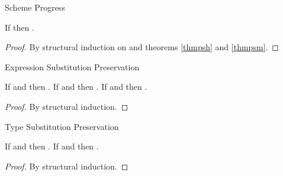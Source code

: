 \begin{theorem}{Scheme Progress}

\label{thmpss}
If \judes{}{\first{\varexps}}{\tytst} then \pshyp{\first{\varexps}}{\second{\varexps}}.
\begin{proof}
By structural induction on \first{\varexps} and theorems \ref{thmpsh} and \ref{thmpsm}.
\end{proof}
\end{theorem}

\begin{lemma}{Expression Substitution Preservation}

\label{lemexp}
If \judeh{\envexte{\env}{\first{\varvarh}}{\first{\vartyh}}}{\first{\varexph}}{\second{\vartyh}} and \judeh{\env}{\second{\varexph}}{\first{\vartyh}} then \judeh{\env}{\expsubst{\first{\varexph}}{\second{\varexph}}{\first{\varvarh}}}{\second{\vartyh}}.  If \judem{\envexte{\env}{\first{\varvarm}}{\first{\vartym}}}{\first{\varexpm}}{\second{\vartym}} and \judem{\env}{\second{\varexpm}}{\first{\vartym}} then \judem{\env}{\expsubst{\first{\varexpm}}{\second{\varexpm}}{\first{\varvarm}}}{\second{\vartym}}.  If \judes{\envexte{\env}{\first{\varvars}}{\tytst}}{\first{\varexps}}{\tytst} and \judes{\env}{\second{\varexps}}{\tytst} then \judes{\env}{\expsubst{\first{\varexps}}{\second{\varexps}}{\first{\varvars}}}{\tytst}.
\begin{proof}
By structural induction.
\end{proof}
\end{lemma}

\begin{lemma}{Type Substitution Preservation}

\label{lemtyp}
If \judeh{\envextt{\env}{\first{\tyvarh}}}{\first{\varexph}}{\first{\vartyh}} and \judth{\env}{\second{\vartyh}} then \judeh{\env}{\expsubst{\first{\varexph}}{\second{\vartyh}}{\first{\tyvarh}}}{\tysubst{\first{\vartyh}}{\second{\vartyh}}{\first{\tyvarh}}}.  If \judem{\envextt{\env}{\first{\tyvarm}}}{\first{\varexpm}}{\first{\vartym}} and \judtm{\env}{\second{\vartym}} then \judem{\env}{\expsubst{\first{\varexpm}}{\second{\vartym}}{\first{\tyvarm}}}{\tysubst{\first{\vartym}}{\second{\vartym}}{\first{\tyvarm}}}.
\begin{proof}
By structural induction.
\end{proof}
\end{lemma}

